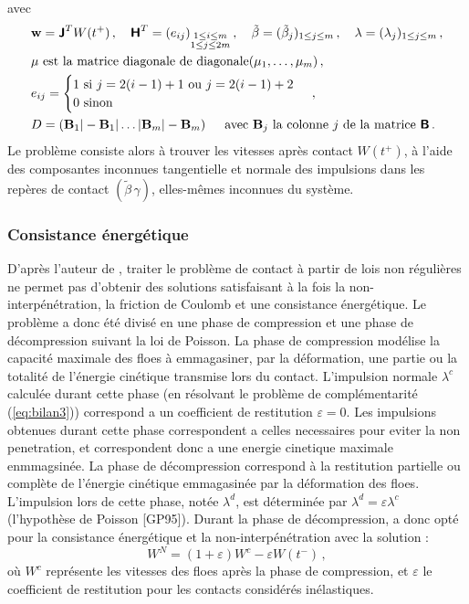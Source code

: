 avec
\begin{align*}
    &\bm{\mathrm{w}} = \bm{\mathsf{J}}^T W(t^+) \,, \quad
    \bm{\mathsf{H}}^T = (e_{ij})_{\substack{1 \leq i \leq m \\ 1 \leq j \leq 2m}} \,, \quad \tilde{\beta} = (\tilde{\beta}_j)_{1\leq j \leq m} \,, \quad \lambda = (\lambda_j)_{1 \leq j \leq m} \,, \\
    &\mu \text{ est la matrice diagonale de diagonale} (\mu_1,\dots, \mu_m) \,,\\
    &e_{ij} = \begin{cases}
        1 \text{   si } j = 2(i-1) + 1 \text{ ou } j=2(i-1) + 2 \\
        0 \text{   sinon} 
    \end{cases} \,,\\
    &D = (\bm{\mathrm{B}}_1 \vert - \bm{\mathrm{B}}_1 \vert \ldots \vert \bm{\mathrm{B}}_m \vert -\bm{\mathrm{B}}_m) \, \quad \text{ avec } \bm{\mathrm{B}}_j \text{ la colonne } j \text{ de la matrice } \bm{\mathsf{B}} \,.
\end{align*}
Le problème consiste alors à trouver les vitesses après contact $W(t^{+})$, à l’aide des composantes inconnues tangentielle et normale des impulsions dans les repères de contact $(\tilde{\beta}\, \gamma)$, elles-mêmes inconnues du système.


\subsubsection{Consistance énergétique}
D'après l'auteur de \parencite[p.42]{rabatel2015thesis}, traiter le problème de contact à partir de lois non régulières ne permet pas d’obtenir des solutions satisfaisant à la fois la non-interpénétration, la friction de Coulomb et une consistance énergétique. Le problème a donc été divisé en une phase de compression et une phase de décompression suivant la loi de Poisson. La phase de compression modélise la capacité maximale des
floes à emmagasiner, par la déformation, une partie ou la totalité de l’énergie cinétique transmise lors du contact. L'impulsion normale $\lambda^c$ calculée durant cette phase (en résolvant le problème de complémentarité (\cref{eq:bilan3})) correspond a un coefficient de restitution $\varepsilon = 0$. Les impulsions obtenues durant cette phase correspondent a celles necessaires pour eviter la non penetration, et correspondent donc a une energie cinetique maximale enmmagsinée. La phase de décompression correspond à la restitution partielle ou complète de l’énergie cinétique emmagasinée par la déformation des floes. L’impulsion lors de cette phase, notée $\lambda^d$, est déterminée par $\lambda^d = \varepsilon \lambda^c$ (l’hypothèse de Poisson [GP95]). Durant la phase de décompression, \citeauthor{rabatel2015thesis} a donc opté pour la consistance énergétique et la non-interpénétration avec la solution :
$$
W^N = (1 + \varepsilon)W^{c} - \varepsilon W(t^{-}) \,,
$$
où $W^c$ représente les vitesses des floes après la phase de compression, et $\varepsilon$ le coefficient de restitution pour les contacts considérés inélastiques.

